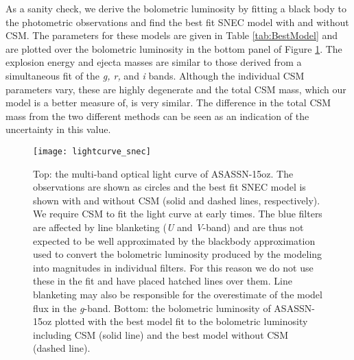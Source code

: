 \documentclass[a4paper,fleqn,usenatbib]{mnras}
\begin{document}
As a sanity check, we derive the bolometric luminosity by fitting a black body to the photometric observations and find the best fit SNEC model with and without CSM. 
The parameters for these models are given in Table \ref{tab:BestModel} and are plotted over the bolometric luminosity in the bottom panel of Figure \ref{fig:snecLC}.
The explosion energy and ejecta masses are similar to those derived from a simultaneous fit of the {\it g, r,} and {\it i} bands. 
Although the individual CSM parameters vary, these are highly degenerate and the total CSM mass, which our model is a better measure of, is very similar.
The difference in the total CSM mass from the two different methods can be seen as an indication of the uncertainty in this value. 
\begin{figure}
\begin{center}
\texttt{[image: lightcurve\_snec]} %
\caption{Top: the multi-band optical light curve of ASASSN-15oz. 
The observations are shown as circles and the best fit SNEC model is shown with and without CSM (solid and dashed lines, respectively).
We require CSM to fit the light curve at early times. 
The blue filters are affected by line blanketing ({\it U} and {\it V}-band) and are thus not expected to be well approximated by the blackbody approximation used to convert the bolometric luminosity produced by the modeling into magnitudes in individual filters. 
For this reason we do not use these in the fit and have placed hatched lines over them.
Line blanketing may also be responsible for the overestimate of the model flux in the {\it g}-band.
Bottom: the bolometric luminosity of ASASSN-15oz plotted with the best model fit to the bolometric luminosity including CSM (solid line) and the best model without CSM (dashed line).}
\label{fig:snecLC}
\end{center}
\end{figure}
\end{document}
